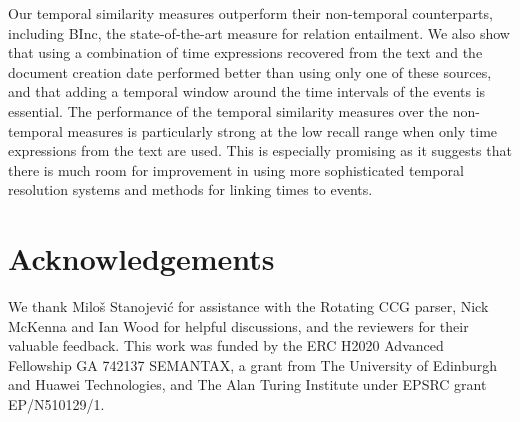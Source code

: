 \documentclass[11pt]{article}
\begin{document}
Our temporal similarity measures outperform their non-temporal counterparts, including BInc, the state-of-the-art measure for relation entailment. We also show that using a combination of time expressions recovered from the text and the document creation date performed better than using only one of these sources, and that adding a temporal window around the time intervals of the events is essential. The performance of the temporal similarity measures over the non-temporal measures is particularly strong at the low recall range when only time expressions from the text are used. This is especially promising as it suggests that there is much room for improvement in using more sophisticated temporal resolution systems and methods for linking times to events.


\section*{Acknowledgements}
\label{sec:acknowledgements}

We thank Miloš Stanojević for assistance with the Rotating CCG parser, Nick McKenna and Ian Wood for helpful discussions, and the reviewers for their valuable feedback. This work was funded by the ERC H2020 Advanced Fellowship GA 742137 SEMANTAX, a grant from The University of Edinburgh and Huawei Technologies, and The Alan Turing Institute under EPSRC grant EP/N510129/1.



\end{document}

